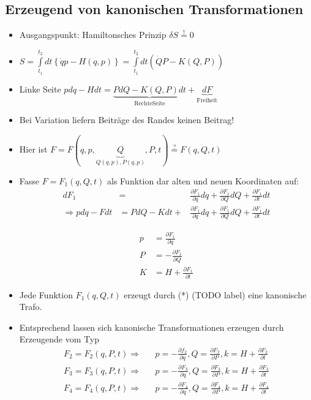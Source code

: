 \subsection{Erzeugend von kanonischen Transformationen}
\begin{itemize}
\item Ausgangspunkt: Hamiltonsches Prinzip
  $\delta S \stackrel{!}{=} 0$
\item
  $S = \int\limits_{t_1}^{t_2} dt \left\{ \dot{q} p - H(q,p) \right\}
  = \int\limits_{t_1}^{t_2}dt \left( \dot{Q}P - K(Q,P) \right) $
\item Linke Seite
  $pdq - Hdt = \underbrace{PdQ - K(Q,P) dt}_{\mathrm{Rechte Seite}} +
  \underbrace{dF}_{\mathrm{Freiheit}}$
\item Bei Variation liefern Beiträge des Randes keinen Beitrag!
\item Hier ist
  $F = F \left( q,p,\underbrace{Q}_{Q(q,p),P(q,p)},P,t \right)
  \stackrel{?}{=} F(q,Q,t)$
\item Fasse $F = F_1(q,Q,t)$ als Funktion dar alten und neuen
  Koordinaten auf:
  \begin{align*}
\label{eq:2}
dF_1 &= &\frac{\partial F_1}{\partial q}dq + \frac{ \partial F_1}{\partial Q}dQ + \frac{\partial F_1}{\partial t} dt\\
\Rightarrow pdq - Fdt &= PdQ - Kdt + &\frac{\partial F_1}{\partial q}dq + \frac{ \partial F_1}{\partial Q}dQ + \frac{\partial F_1}{\partial t} dt
\end{align*}

\begin{align*}
p &= \frac{\partial F_1}{\partial q}\\
P &= - \frac{\partial F_1}{\partial Q}\\
K &= H + \frac{\partial F_1}{\partial t}
\end{align*}
\item Jede Funktion $F_1(q,Q,t)$ erzeugt durch (*) (TODO label) eine
  kanonische Trafo.
\item Entsprechend lassen sich kanonische Transformationen erzeugen
  durch Erzeugende vom Typ
  \begin{align*}
F_2 = F_2(q,P,t) \Rightarrow &&p = -\frac{\partial f_2}{\partial q}, Q = \frac{\partial F_2}{\partial P}, k = H + \frac{\partial F_2}{\partial t}\\
F_3 = F_3(q,P,t) \Rightarrow &&p = -\frac{\partial F_3}{\partial q}, Q = \frac{\partial F_3}{\partial P}, k = H + \frac{\partial F_3}{\partial t}\\
F_4 = F_4(q,P,t) \Rightarrow &&p = -\frac{\partial F_4}{\partial q}, Q = \frac{\partial F_4}{\partial P}, k = H + \frac{\partial F_4}{\partial t}
\end{align*}

\end{itemize}


